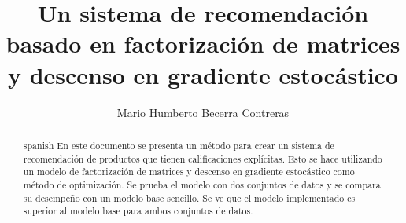 \documentclass{tesisITAM}
\title{Un sistema de recomendación basado en factorización de matrices y descenso en gradiente estocástico}
\author{Mario Humberto Becerra Contreras}
\begin{document}
	\npthousandsep{,}
	\maketitle
	\publicationrights
	

	
	


	\begin{abstract}{spanish}
		En este documento se presenta un método para crear un sistema de recomendación de productos que tienen calificaciones explícitas. Esto se hace utilizando un modelo de factorización de matrices y descenso en gradiente estocástico como método de optimización. Se prueba el modelo con dos conjuntos de datos y se compara su desempeño con un modelo base sencillo. Se ve que el modelo implementado es superior al modelo base para ambos conjuntos de datos.
	\end{abstract}

	\setcounter{page}{1}

	\tableofcontents
	\listoffigures
	\listoftables
	\newpage

	\setcounter{page}{1}


	
	
	
	
	

	

	
	

	\appendix

	\clearpage
	

\begingroup
\raggedright
\sloppy
\printbibliography
\endgroup

\nocite{*}
\end{document}
